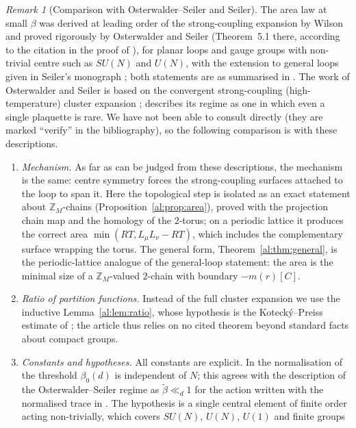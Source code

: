\documentclass[11pt,a4paper]{article}
\theoremstyle{definition}
\theoremstyle{remark}
\newtheorem{remark}[theorem]{Remark}
\newcommand{\Z}{\mathbb{Z}}
\begin{document}
\begin{remark}[Comparison with Osterwalder--Seiler and Seiler]\label{al:rem:OS}
The area law at small $\beta$ was derived at leading order of the strong-coupling expansion by Wilson \cite{Wil74} and
proved rigorously by Osterwalder and Seiler \cite{OS78} (Theorem~5.1 there, according to the citation in the proof of
\cite[Theorem~1.2]{CNS25a}), for planar loops and gauge groups with non-trivial centre such as $SU(N)$ and $U(N)$, with
the extension to general loops given in Seiler's monograph \cite{Sei82}; both statements are as summarised in
\cite[Section~3]{Cha19a}. The work of Osterwalder and Seiler is based on the convergent strong-coupling
(high-temperature) cluster expansion \cite[Section~1]{SZZ23}; \cite[Remark~1.5]{CNS25a} describes its regime as one in which
even a single plaquette is rare. We have not been able to consult \cite{OS78,Sei82} directly
(they are marked ``verify'' in the bibliography), so the following comparison is with these descriptions.
\begin{enumerate}[label=(\roman*)]
\item \emph{Mechanism.} As far as can be judged from these descriptions, the mechanism is the same: centre symmetry
forces the strong-coupling surfaces attached to the loop to span it. Here the topological step is isolated as an exact statement about $\Z_M$-chains
(Proposition~\ref{al:prop:area}), proved with the projection chain map and the homology of the $2$-torus; on a periodic
lattice it produces the correct area $\min(RT,L_\mu L_\nu-RT)$, which includes the complementary surface wrapping the
torus. The general form, Theorem~\ref{al:thm:general}, is the periodic-lattice analogue of the general-loop statement:
the area is the minimal size of a $\Z_M$-valued $2$-chain with boundary $-m(r)[C]$.
\item \emph{Ratio of partition functions.} Instead of the full cluster expansion we use the inductive
Lemma~\ref{al:lem:ratio}, whose hypothesis is the Kotecký--Preiss estimate of \cite{F}; the article thus relies on no
cited theorem beyond standard facts about compact groups.
\item \emph{Constants and hypotheses.} All constants are explicit. In the normalisation of \cite{F} the threshold
$\beta_0(d)$ is independent of $N$; this agrees with the description of the Osterwalder--Seiler regime as
$\tilde\beta\ll_d1$ for the action written with the normalised trace in \cite[Figure~1]{CNS25a}. The hypothesis is a
single central element of finite order acting non-trivially, which covers $SU(N)$, $U(N)$, $U(1)$ and finite groups

\end{enumerate}
\end{remark}
\end{document}
